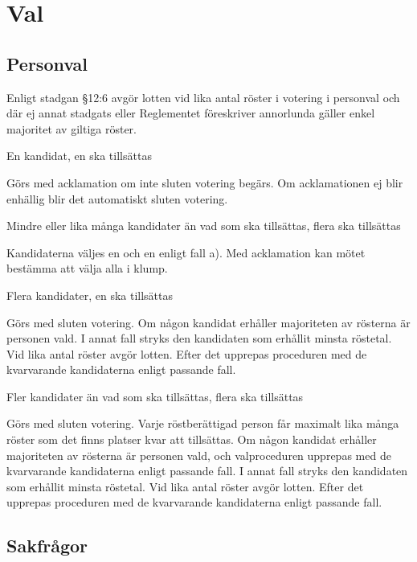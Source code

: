 \documentclass[10pt]{article}
\begin{document}
\section{Val}

\subsection{Personval}

Enligt stadgan §12:6 avgör lotten vid lika antal röster i votering i personval och där ej annat stadgats eller Reglementet föreskriver annorlunda gäller enkel majoritet av giltiga röster.

\begin{alphlist}
\item En kandidat, en ska tillsättas

Görs med acklamation om inte sluten votering begärs. Om acklamationen ej blir
enhällig blir det automatiskt sluten votering.

\item Mindre eller lika många kandidater än vad som ska tillsättas, flera ska tillsättas

Kandidaterna väljes en och en enligt fall a). Med acklamation kan mötet bestämma att välja alla i klump.

\item Flera kandidater, en ska tillsättas

Görs med sluten votering. Om någon kandidat erhåller majoriteten av rösterna är personen vald. I annat fall stryks den kandidaten som erhållit minsta röstetal. Vid lika antal röster avgör lotten. Efter det upprepas proceduren med de kvarvarande kandidaterna enligt passande fall.

\item Fler kandidater än vad som ska tillsättas, flera ska tillsättas

Görs med sluten votering. Varje röstberättigad person får maximalt lika många röster som det finns platser kvar att tillsättas. Om någon kandidat erhåller majoriteten av rösterna är personen vald, och valproceduren upprepas med de kvarvarande kandidaterna enligt passande fall. I annat fall stryks den kandidaten som erhållit minsta röstetal. Vid lika antal röster avgör lotten. Efter det upprepas proceduren med de kvarvarande kandidaterna enligt passande fall.
\end{alphlist}

\subsection{Sakfrågor}
\end{document}
